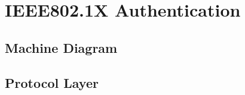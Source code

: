\section{IEEE802.1X Authentication}
\toc
\subsection{Machine Diagram}
\begin{frame}{\ft}
    
\end{frame}
\subsection{Protocol Layer}
\begin{frame}{\ft}
    
\end{frame}